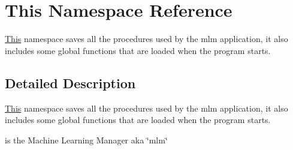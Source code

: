 \hypertarget{namespaceThis}{}\section{This Namespace Reference}
\label{namespaceThis}


\mbox{\hyperlink{namespaceThis}{This}} namespace saves all the procedures used by the mlm application, it also includes some global functions that are loaded when the program starts.  




\subsection{Detailed Description}
\mbox{\hyperlink{namespaceThis}{This}} namespace saves all the procedures used by the mlm application, it also includes some global functions that are loaded when the program starts. 

is the Machine Learning Manager aka \char`\"{}mlm\char`\"{} 